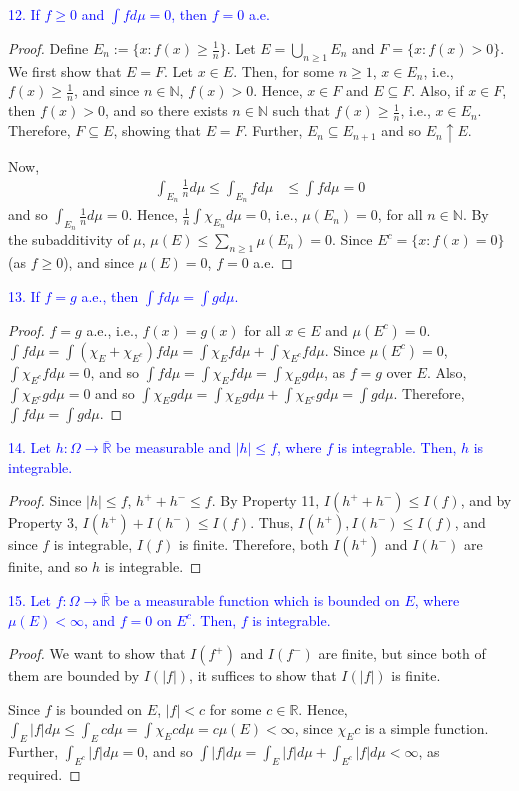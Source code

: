 \documentclass[12pt]{extarticle}
\newcommand{\R}{\overline{\mathbb{R}}}
\newcommand{\sub}{\subseteq}
\begin{document}
\textcolor{blue}{12. If $f \geq 0$ and $\int f d\mu = 0$, then $f = 0$ a.e.}
\begin{proof}
    Define $E_n := \{ x: f(x) \geq \frac{1}{n} \}$. Let $E = \bigcup _{n \geq 1} E_n$ and $F = \{ x: f(x) > 0\}$. We first show that $E = F$. Let $x \in E$. Then, for some $n \geq 1$, $x \in E_n$, i.e., $f(x) \geq \frac{1}{n}$, and since $n \in \mathbb{N}$, $f(x) > 0$. Hence, $x \in F$ and $E \sub F$. Also, if $x \in F$, then $f(x) > 0$, and so there exists $n \in \mathbb{N}$ such that $f(x) \geq \frac{1}{n}$, i.e., $x \in E_n$. Therefore, $F \sub E$, showing that $E = F$. Further, $E_n \sub E_{n + 1}$ and so $E_n \uparrow E$. 

    Now, 
    \begin{align*}
        \int_{E_n} \frac{1}{n} d\mu \leq \int_{E_n} f d\mu &\leq \int f d\mu = 0
    \end{align*}
    and so $\int_{E_n} \frac{1}{n} d \mu = 0$. Hence, $\frac{1}{n} \int \chi_{E_n} d\mu = 0$, i.e., $\mu(E_n) = 0$, for all $n \in \mathbb{N}$. By the subadditivity of $\mu$, $\mu(E) \leq \sum_{n \geq 1} \mu(E_n) = 0 $. Since $E^c = \{ x: f(x) = 0\}$ (as $f \geq 0$),  and since $\mu(E) = 0$, $f = 0$ a.e.
\end{proof}

\textcolor{blue}{13. If $f = g$ a.e., then $\int f d\mu = \int g d\mu$.}
\begin{proof}
    $f = g$ a.e., i.e., $f(x) = g(x)$ for all $x \in E$ and $\mu(E^c) = 0$. $\int f d\mu = \int (\chi_E + \chi_{E^c}) f d\mu = \int \chi_E f d\mu + \int \chi_{E^c} f d\mu$. Since $\mu(E^c) = 0$, $\int \chi_{E^c} f d\mu = 0$, and so $\int fd\mu = \int \chi_E f d\mu = \int \chi_E g d\mu$, as $f = g$ over $E$. Also, $\int \chi_{E^c} g d\mu = 0$ and so $\int \chi_E g d\mu = \int \chi_E g d\mu + \int \chi_{E^c} g d\mu = \int g d\mu$. Therefore, $\int f d\mu = \int gd\mu$.
\end{proof}

\textcolor{blue}{14. Let $h: \Omega \to \R$ be measurable and $|h| \leq f$, where $f$ is integrable. Then, $h$ is integrable.}
\begin{proof}
    Since $|h| \leq f$, $h^+ + h^- \leq f$. By Property 11, $I(h^+ + h^-) \leq I(f)$, and by Property 3, $I(h^+) + I(h^-) \leq I(f)$. Thus, $I(h^+), I (h^-) \leq I(f)$, and since $f$ is integrable, $I(f)$ is finite. Therefore, both $I(h^+)$ and $I(h^-)$ are finite, and so $h$ is integrable.
\end{proof}

\textcolor{blue}{15. Let $f:\Omega \to \R$  be a measurable function which is bounded on $E$, where $\mu(E) < \infty$, and $f = 0$ on $E^c$. Then, $f$ is integrable.}
\begin{proof}
    We want to show that $I(f^+)$ and $I(f^-)$ are finite, but since both of them are bounded by $I(|f|)$, it suffices to show that $I(|f|)$ is finite.

    Since $f$ is bounded on $E$, $|f| < c$ for some $c \in \mathbb{R}$. Hence, $\int_E |f| d\mu \leq \int_E c d\mu = \int \chi_{E} c d\mu = c \mu(E) < \infty$, since $\chi_{E}c$ is a simple function. Further, $\int_{E^c} |f| d \mu = 0$, and so $\int |f| d\mu = \int_E |f| d\mu + \int_{E^c} |f|d\mu < \infty$, as required.
\end{proof}
\end{document}

